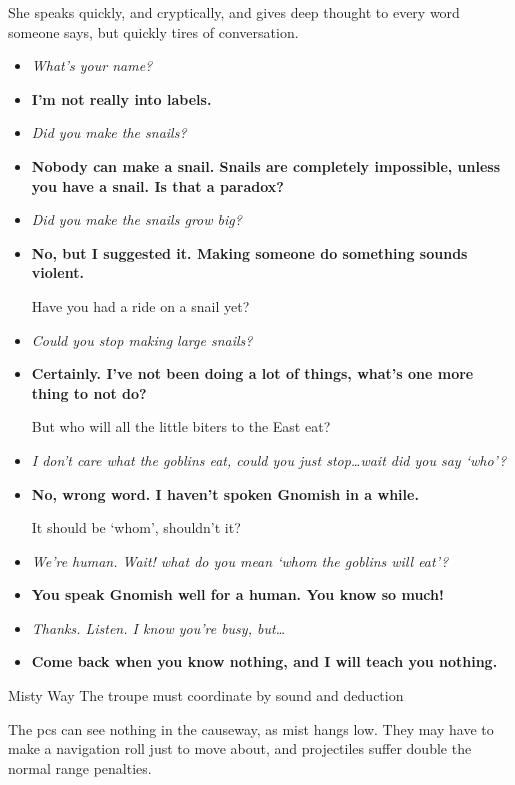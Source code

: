 \begin{multicols}{2}
She speaks quickly, and cryptically, and gives deep thought to every word someone says, but quickly tires of conversation.

\begin{itemize}
  \item\it
  What's your name?
  \item[\adforn{54}]\bf
  I'm not really into labels.
  \item\it
  Did you make the snails?
  \item[\adforn{54}]\bf
  Nobody can make a snail.
  Snails are completely impossible, unless you have a snail.
  Is that a paradox?
  \item\it
  Did you make the snails grow big?
  \item[\adforn{54}]\bf
  No, but I suggested it.
  Making someone do something sounds violent.

  Have you had a ride on a snail yet?
  \item\it
  Could you stop making large snails?
  \item[\adforn{54}]\bf
  Certainly.
  I've not been doing a lot of things, what's one more thing to not do?

  But who will all the little biters to the East eat?
  \item\it
  I don't care what the goblins eat, could you just stop\ldots wait did you say `who'?
  \item[\adforn{54}]\bf
  No, wrong word.
  I haven't spoken Gnomish in a while.

  It should be `whom', shouldn't it?
  \item\it
  We're human.
  Wait! what do you mean `whom the goblins will eat'?
  \item[\adforn{54}]\bf
  You speak Gnomish well for a human.
  You know so much!
  \item\it
  Thanks.
  Listen.
  I know you're busy, but\ldots
  \item[\adforn{54}]\bf
  Come back when you know nothing, and I will teach you nothing.
\end{itemize}

\LifeElder

\showStdSpells

{Misty Way}%
{The troupe must coordinate by sound and deduction}%

The \glspl{pc} can see nothing in the causeway, as mist hangs low.
They may have to make a navigation roll just to move about, and projectiles suffer double the normal range penalties.


\end{multicols}

